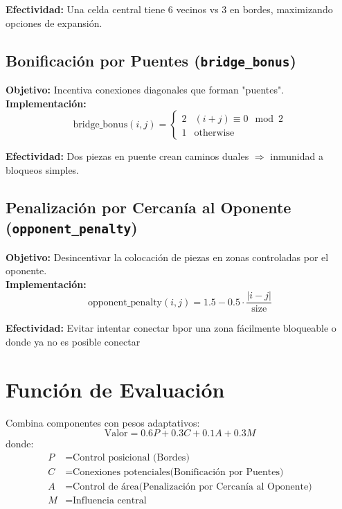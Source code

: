 \documentclass{article}
\begin{document}
\textbf{Efectividad:} Una celda central tiene 6 vecinos vs 3 en bordes, maximizando opciones de expansión.

\subsection{Bonificación por Puentes (\texttt{bridge\_bonus})}
\textbf{Objetivo:} Incentiva conexiones diagonales que forman "puentes".\\
\textbf{Implementación:}
\begin{equation*}
    \text{bridge\_bonus}(i,j) = 
    \begin{cases}
        2 & (i+j) \equiv 0 \mod 2 \\
        1 & \text{otherwise}
    \end{cases}
\end{equation*}

\textbf{Efectividad:} Dos piezas en puente crean caminos duales $\Rightarrow$ inmunidad a bloqueos simples.

\subsection{Penalización por Cercanía al Oponente (\texttt{opponent\_penalty})}
\textbf{Objetivo:} Desincentivar la colocación de piezas en zonas controladas por el oponente.\\
\textbf{Implementación:}
\begin{equation*}
    \text{opponent\_penalty}(i,j) = 1.5 - 0.5 \cdot \frac{|i - j|}{\text{size}}
\end{equation*}

\textbf{Efectividad:} Evitar intentar conectar bpor una zona fácilmente bloqueable o donde ya no es posible conectar

\section{Función de Evaluación}
Combina componentes con pesos adaptativos:
\begin{equation*}
    \text{Valor} = 0.6P + 0.3C + 0.1A + 0.3M
\end{equation*}
donde:
\begin{align*}
    P & = \text{Control posicional (Bordes)} \\
    C & = \text{Conexiones potenciales(Bonificación por Puentes)} \\
    A & = \text{Control de área(Penalización por Cercanía al Oponente)} \\
    M & = \text{Influencia central}
\end{align*}
\end{document}

